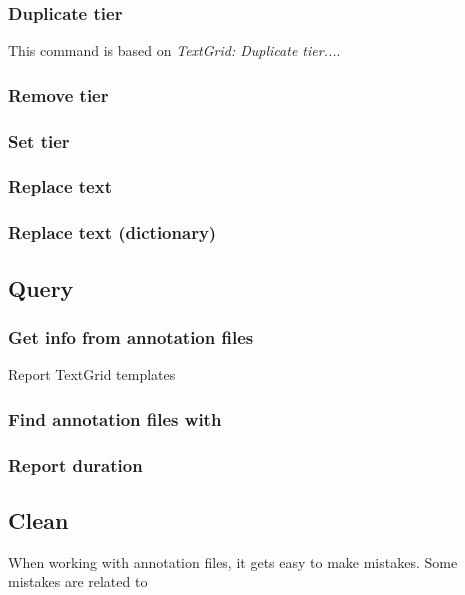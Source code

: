 \documentclass[10pt,a4paper]{article}
\begin{document}
\subsubsection{Duplicate tier}
This command is based on \emph{TextGrid: Duplicate tier...}. 
\subsubsection{Remove tier}
\subsubsection{Set tier}
\subsubsection{Replace text}
\subsubsection{Replace text (dictionary)}


\subsection{Query}
\subsubsection{Get info from annotation files}
Report TextGrid templates
\subsubsection{Find annotation files with}
\subsubsection{Report duration}
\subsection{Clean}
When working with annotation files, it gets easy to make mistakes. Some mistakes are related to 
\end{document}
